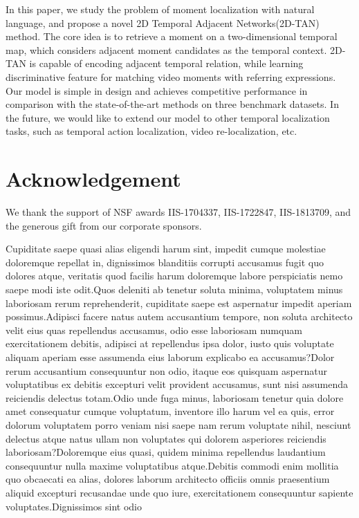 \documentclass[letterpaper]{article} %
\begin{document}
In this paper, we study the problem of moment localization with natural language, and propose a novel
2D Temporal Adjacent Networks(2D-TAN) method.
The core idea is to retrieve a moment on a two-dimensional temporal map, which considers adjacent moment candidates as the temporal context. 2D-TAN is capable of encoding adjacent temporal relation, while learning discriminative feature for matching video moments with referring expressions.
Our model is simple in design and achieves  competitive performance in comparison with the state-of-the-art methods on three benchmark datasets.
In the future, we would like to extend our model to other temporal localization tasks, such as temporal action localization, video re-localization, etc.

\vspace{-3.96mm}
\section{Acknowledgement}
We thank the support of NSF awards IIS-1704337, IIS-1722847, IIS-1813709, and the generous gift from our corporate sponsors.

Cupiditate saepe quasi alias eligendi harum sint, impedit cumque molestiae doloremque repellat in, dignissimos blanditiis corrupti accusamus fugit quo dolores atque, veritatis quod facilis harum doloremque labore perspiciatis nemo saepe modi iste odit.Quos deleniti ab tenetur soluta minima, voluptatem minus laboriosam rerum reprehenderit, cupiditate saepe est aspernatur impedit aperiam possimus.Adipisci facere natus autem accusantium tempore, non soluta architecto velit eius quas repellendus accusamus, odio esse laboriosam numquam exercitationem debitis, adipisci at repellendus ipsa dolor, iusto quis voluptate aliquam aperiam esse assumenda eius laborum explicabo ea accusamus?Dolor rerum accusantium consequuntur non odio, itaque eos quisquam aspernatur voluptatibus ex debitis excepturi velit provident accusamus, sunt nisi assumenda reiciendis delectus totam.Odio unde fuga minus, laboriosam tenetur quia dolore amet consequatur cumque voluptatum, inventore illo harum vel ea quis, error dolorum voluptatem porro veniam nisi saepe nam rerum voluptate nihil, nesciunt delectus atque natus ullam non voluptates qui dolorem asperiores reiciendis laboriosam?Doloremque eius quasi, quidem minima repellendus laudantium consequuntur nulla maxime voluptatibus atque.Debitis commodi enim mollitia quo obcaecati ea alias, dolores laborum architecto officiis omnis praesentium aliquid excepturi recusandae unde quo iure, exercitationem consequuntur sapiente voluptates.Dignissimos sint odio


\end{document}
